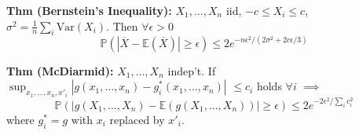 \documentclass[10pt,twocolumn]{article}
\begin{document}
    \textbf{Thm (Bernstein's Inequality):}
    $X_{1},\ldots,X_{n}$ iid, $-c \leq X_{i} \leq c$, $\sigma^2 = \frac{1}{n}\sum_i \text{Var}(X_i)$. Then $\forall \epsilon >0$
    \begin{equation}
        \mathbb{P} \left(\left| \overline{X} - \mathbb{E}\left(\overline{X}\right) \right| \geq \epsilon \right) \leq 2e^{-n\epsilon^2/(2\sigma^2 + 2c\epsilon/3)}
    \end{equation}

    \textbf{Thm (McDiarmid):} $X_{1},\ldots,X_{n}$ indep't. If\\
    $\sup_{x_{1},\ldots,x_{n},x'_{i}} \left| g(x_{1},\ldots,x_{n}) - g_{i}^{*}(x_{1},\ldots,x_{n}) \right|$ $\leq c_{i}$ holds $\forall i$ $\implies$
    \begin{equation}
        \mathbb{P} \left(\left| g(X_{1},\ldots,X_{n})-\mathbb{E}(g(X_{1},\ldots,X_{n})) \right| \geq \epsilon \right) \leq 2e^{-2\epsilon^{2}/\sum_{i}c_{i}^{2}}
    \end{equation}
    where $g_{i}^{*} = g$ with $x_{i}$ replaced by $x'_{i}$.
\end{document}
